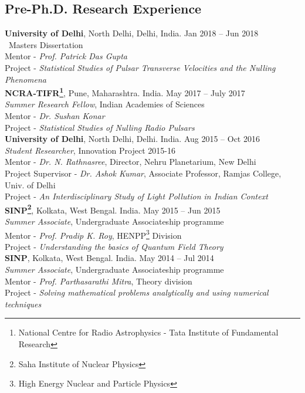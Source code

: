 \documentclass[margin,line]{res}
\begin{document}
\begin{resume}

\section{\sc Pre-Ph.D. Research Experience}
{\bf University of Delhi}, North Delhi, Delhi, India. \hfill{Jan 2018 -- Jun 2018}\\
{\ Masters Dissertation}\\
Mentor - {\em Prof. Patrick Das Gupta}\\
Project - {\em Statistical Studies of Pulsar Transverse Velocities and the Nulling Phenomena}\\

{\bf NCRA-TIFR\footnote{National Centre for Radio Astrophysics - Tata Institute of Fundamental Research}}, Pune, Maharashtra. India. \hfill{May 2017 -- July 2017}\\
{\em Summer Research Fellow}, Indian Academies of Sciences\\
Mentor - {\em Dr. Sushan Konar}\\
Project - {\em Statistical Studies of Nulling Radio Pulsars}\\

{\bf University of Delhi}, North Delhi, Delhi. India. \hfill{Aug 2015 -- Oct 2016}\\
{\em Student Researcher}, Innovation Project 2015-16\\
Mentor - {\em Dr. N. Rathnasree}, Director, Nehru Planetarium, New Delhi\\
Project Supervisor - {\em Dr. Ashok Kumar}, Associate Professor, Ramjas College, Univ. of Delhi\\
Project - {\em An Interdisciplinary Study of Light Pollution in Indian Context}\\

{\bf SINP\footnote{Saha Institute of Nuclear Physics}}, Kolkata, West Bengal. India. \hfill{May 2015 -- Jun 2015}\\
{\em Summer Associate}, Undergraduate Associateship programme\\
Mentor - {\em Prof. Pradip K. Roy}, HENPP\footnote{High Energy Nuclear and Particle Physics} Division\\
Project - {\em Understanding the basics of Quantum Field Theory}\\

{\bf SINP}, Kolkata, West Bengal. India. \hfill{May 2014 -- Jul 2014}\\
{\em Summer Associate}, Undergraduate Associateship programme\\
Mentor - {\em Prof. Parthasarathi Mitra}, Theory division\\
Project - {\em Solving mathematical problems analytically and using numerical techniques}\\


\end{resume}
\end{document}
